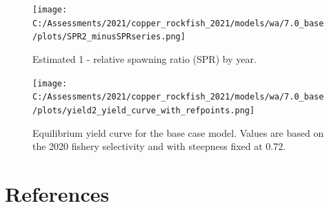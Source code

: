 \documentclass[11pt,
  english,
  a4paper,
]{article}
\begin{document}
\tagmcend\tagstructend


\begin{figure}
\centering
\texttt{[image: C:/Assessments/2021/copper\_rockfish\_2021/models/wa/7.0\_base/plots/SPR2\_minusSPRseries.png]}
\caption{Estimated 1 - relative spawning ratio (SPR) by year.\label{fig:1-spr}}
\end{figure}

\tagmcend\tagstructend


\begin{figure}
\centering
\texttt{[image: C:/Assessments/2021/copper\_rockfish\_2021/models/wa/7.0\_base/plots/yield2\_yield\_curve\_with\_refpoints.png]}
\caption{Equilibrium yield curve for the base case model. Values are based on the 2020 fishery selectivity and with steepness fixed at 0.72.\label{fig:yield}}
\end{figure}

\tagmcend\tagstructend

\clearpage


\hypertarget{references}{%
\section{References}\label{references}}

\leavevmode\tagmcend\tagstructend
\end{document}
